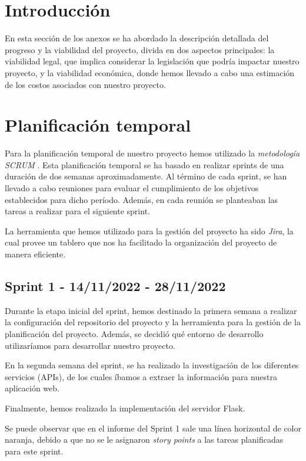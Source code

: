 
\section{Introducción}
En esta sección de los anexos se ha abordado la descripción detallada del progreso y la viabilidad del proyecto, divida en dos aspectos principales: la viabilidad legal, que implica considerar la legislación que podría impactar nuestro proyecto, y la viabilidad económica, donde hemos llevado a cabo una estimación de los costos asociados con nuestro proyecto.

\section{Planificación temporal}

Para la planificación temporal de nuestro proyecto hemos utilizado la \textit{metodología SCRUM} \cite{SCRUM}. Esta planificación temporal se ha basado en realizar sprints de una duración de dos semanas aproximadamente. Al término de cada sprint, se han llevado a cabo reuniones para evaluar el cumplimiento de los objetivos establecidos para dicho período. Además, en cada reunión se planteaban las tareas a realizar para el siguiente sprint.

La herramienta que hemos utilizado para la gestión del proyecto ha sido \textit{Jira}, la cual provee un tablero que nos ha facilitado la organización del proyecto de manera eficiente.

\newpage
\subsection{Sprint 1 - 14/11/2022 - 28/11/2022}

Durante la etapa inicial del sprint, hemos destinado la primera semana a realizar la configuración del repositorio del proyecto y la herramienta para la gestión de la planificación del proyecto. Además, se decidió qué entorno de desarrollo utilizaríamos para desarrollar nuestro proyecto.

En la segunda semana del sprint, se ha realizado la investigación  de los diferentes servicios (APIs), de los cuales íbamos a extraer la información para nuestra aplicación web.

Finalmente, hemos realizado la implementación del servidor Flask.

Se puede observar que en el informe del Sprint 1 sale una línea horizontal de color naranja, debido a que no se le asignaron \textit{story points} a las tareas planificadas para este sprint.


